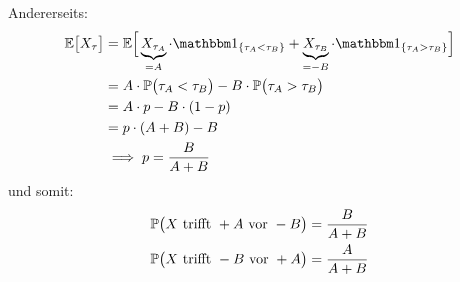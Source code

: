 \begin{beisp}
Andererseits: 
\begin{align*}
\E\big[X_\tau\big]&=\E\Big[\underbrace{X_{\tau_A}}_{=A}\cdot\indi_{\lbrace\tau_A<\tau_B\rbrace}+\underbrace{X_{\tau_B}}_{=-B}\cdot\indi_{\lbrace\tau_A>\tau_B\rbrace}\Big]\\
&=A\cdot\P\big(\tau_A<\tau_B\big)-B\cdot\P\big(\tau_A>\tau_B\big)\\
&=A\cdot p-B\cdot(1-p)\\
&=p\cdot(A+B)-B\\
&\implies
p=\frac{B}{A+B}
\end{align*}
und somit:
\begin{align*}
\P\big(X\text{ trifft }+A\text{ vor }-B\big)&=\frac{B}{A+B}\\
\P\big(X\text{ trifft }-B\text{ vor }+A\big)&=\frac{A}{A+B}\\
\end{align*}


\end{beisp}
